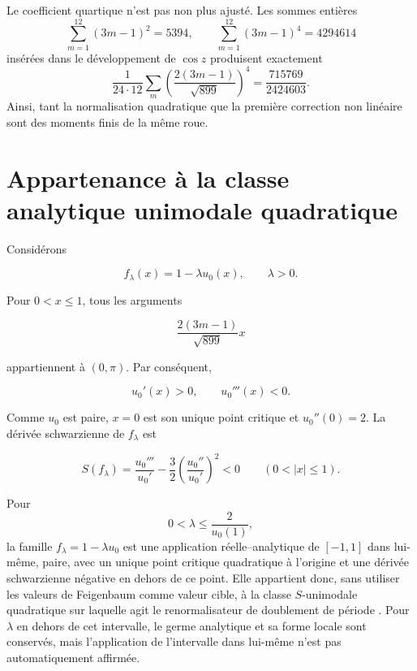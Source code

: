 Le coefficient quartique n’est pas non plus ajusté. Les sommes entières
\begin{equation}
\sum_{m=1}^{12}(3m-1)^2=5394,\qquad
\sum_{m=1}^{12}(3m-1)^4=4294614
\label{mab:rm:eq:chaos-moments24}
\end{equation}
insérées dans le développement de \(\cos z\) produisent exactement
\[
\frac1{24\cdot12}\sum_m
\left(\frac{2(3m-1)}{\sqrt{899}}\right)^4
=\frac{715769}{2424603}.
\]
Ainsi, tant la normalisation quadratique que la première correction non
linéaire sont des moments finis de la même roue.

\section{Appartenance à la classe analytique unimodale quadratique}

Considérons

\[
f_\lambda(x)=1-\lambda u_0(x),\qquad \lambda>0.
\]

Pour \(0<x\le1\), tous les arguments

\[
\frac{2(3m-1)}{\sqrt{899}}x
\]

appartiennent à \((0,\pi)\). Par conséquent,

\[
u_0'(x)>0,\qquad u_0'''(x)<0.
\]

Comme \(u_0\) est paire, \(x=0\) est son unique point critique et \(u_0''(0)=2\). La dérivée schwarzienne de \(f_\lambda\) est

\begin{equation}
S(f_\lambda)
=\frac{u_0'''}{u_0'}
-\frac32\left(\frac{u_0''}{u_0'}\right)^2<0
\qquad(0<|x|\le1).
\label{mab:rm:eq:negative-schwarzian}
\end{equation}

\begin{theorem}
Pour
\[
0<\lambda\le \frac{2}{u_0(1)},
\]
la famille \(f_\lambda=1-\lambda u_0\) est une application réelle--analytique de \([-1,1]\) dans lui-même, paire, avec un unique point critique quadratique à l’origine et une dérivée schwarzienne négative en dehors de ce point. Elle appartient donc, sans utiliser les valeurs de Feigenbaum comme valeur cible, à la classe \(S\)-unimodale quadratique sur laquelle agit le renormalisateur de doublement de période \cite{rm:Feigenbaum1978,rm:Lanford1982}. Pour \(\lambda\) en dehors de cet intervalle, le germe analytique et sa forme locale sont conservés, mais l’application de l’intervalle dans lui-même n’est pas automatiquement affirmée.
\end{theorem}

